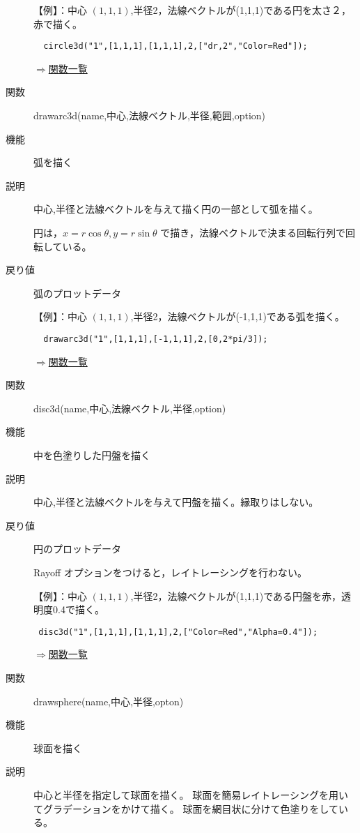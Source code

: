 \documentclass[papersize,a4paper,12pt,uplatex]{jsarticle}
\begin{document}
\begin{description}
 【例】：中心 $(1,1,1)$,半径2，法線ベクトルが(1,1,1)である円を太さ２，赤で描く。
  
\verb|  circle3d("1",[1,1,1],[1,1,1],2,["dr,2","Color=Red"]); |

\begin{flushright} \hyperlink{functionlist}{$\Rightarrow$関数一覧}\end{flushright}

\hypertarget{drawarc3d}{}
\item[関数] drawarc3d(name,中心,法線ベクトル,半径,範囲,option)
\item[機能] 弧を描く
\item[説明] 中心,半径と法線ベクトルを与えて描く円の一部として弧を描く。

円は，$x=r \cos \theta,y=r \sin \theta$ で描き，法線ベクトルで決まる回転行列で回転している。

\item[戻り値] 弧のプロットデータ

 【例】：中心 $(1,1,1)$,半径2，法線ベクトルが(-1,1,1)である弧を描く。
  
\verb|  drawarc3d("1",[1,1,1],[-1,1,1],2,[0,2*pi/3]); |

\begin{flushright} \hyperlink{functionlist}{$\Rightarrow$関数一覧}\end{flushright}

\hypertarget{disc3d}{}
\item[関数] disc3d(name,中心,法線ベクトル,半径,option)
\item[機能] 中を色塗りした円盤を描く
\item[説明] 中心,半径と法線ベクトルを与えて円盤を描く。縁取りはしない。
\item[戻り値] 円のプロットデータ

 Rayoff オプションをつけると，レイトレーシングを行わない。

 【例】：中心 $(1,1,1)$,半径2，法線ベクトルが(1,1,1)である円盤を赤，透明度0.4で描く。 
 
 \verb| disc3d("1",[1,1,1],[1,1,1],2,["Color=Red","Alpha=0.4"]); |

\begin{flushright} \hyperlink{functionlist}{$\Rightarrow$関数一覧}\end{flushright}

\hypertarget{drawsphere}{}
\item[関数] drawsphere(name,中心,半径,opton)
\item[機能] 球面を描く
\item[説明] 中心と半径を指定して球面を描く。
球面を簡易レイトレーシングを用いてグラデーションをかけて描く。 球面を網目状に分けて色塗りをしている。


\end{description}
\end{document}
